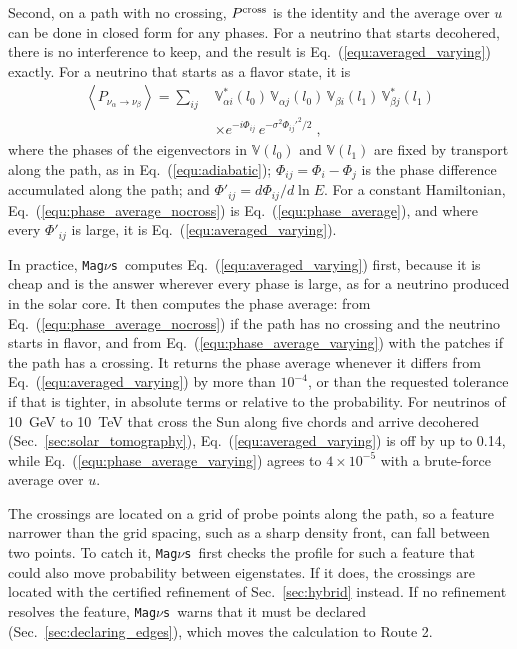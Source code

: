 \documentclass[final,5p,times,twocolumn,sort,compress]{elsarticle}
\makeatletter
\newcommand{\eq}{Eq.}
\DeclareRobustCommand{\_}{%
  \ifmmode\nfss@text{\textunderscore}\else\textunderscore\allowbreak\fi}
\newcommand{\equ}[1]{\eq~(\ref{equ:#1})}
\newcommand{\magnus}{{\tt Mag}\ensuremath{\nu}{\tt s}}
\makeatother
\begin{document}
Second, on a path with no crossing, $P^{\rm cross}$ is the identity and the average over $u$ can be done in closed form for any phases. For a neutrino that starts decohered, there is no interference to keep, and the result is \equ{averaged_varying} exactly. For a neutrino that starts as a flavor state, it is
\begin{align}
 \left\langle P_{\nu_\alpha \to \nu_\beta} \right\rangle
 =
 \sum_{ij}\,
 & \mathbb{V}^\ast_{\alpha i}(l_0)\,\mathbb{V}_{\alpha j}(l_0)\,
 \mathbb{V}_{\beta i}(l_1)\,\mathbb{V}^\ast_{\beta j}(l_1)
 \label{equ:phase_average_nocross} \\
 & \times e^{-i\Phi_{ij}}\, e^{-\sigma^2 \Phi_{ij}'^2/2} \;,
 \nonumber
\end{align}
where the phases of the eigenvectors in $\mathbb{V}(l_0)$ and $\mathbb{V}(l_1)$ are fixed by transport along the path, as in \equ{adiabatic}; $\Phi_{ij} = \Phi_i - \Phi_j$ is the phase difference accumulated along the path; and $\Phi'_{ij} = d\Phi_{ij}/d\ln E$. For a constant Hamiltonian, \equ{phase_average_nocross} is \equ{phase_average}, and where every $\Phi'_{ij}$ is large, it is \equ{averaged_varying}.

In practice, \magnus\ computes \equ{averaged_varying} first, because it is cheap and is the answer wherever every phase is large, as for a neutrino produced in the solar core. It then computes the phase average: from \equ{phase_average_nocross} if the path has no crossing and the neutrino starts in flavor, and from \equ{phase_average_varying} with the patches if the path has a crossing. It returns the phase average whenever it differs from \equ{averaged_varying} by more than $10^{-4}$, or than the requested tolerance if that is tighter, in absolute terms or relative to the probability. For neutrinos of 10~GeV to 10~TeV that cross the Sun along five chords and arrive decohered (Sec.~\ref{sec:solar_tomography}), \equ{averaged_varying} is off by up to 0.14, while \equ{phase_average_varying} agrees to $4 \times 10^{-5}$ with a brute-force average over $u$.

The crossings are located on a grid of probe points along the path, so a feature narrower than the grid spacing, such as a sharp density front, can fall between two points. To catch it, \magnus\ first checks the profile for such a feature that could also move probability between eigenstates. If it does, the crossings are located with the certified refinement of Sec.~\ref{sec:hybrid} instead. If no refinement resolves the feature, \magnus\ warns that it must be declared (Sec.~\ref{sec:declaring_edges}), which moves the calculation to Route 2.
\end{document}
